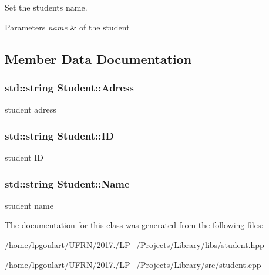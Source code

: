 Set the student\textquotesingle{}s name. 


\begin{DoxyParams}{Parameters}
{\em name} & of the student \\
\hline
\end{DoxyParams}


\subsection{Member Data Documentation}
\subsubsection[{\texorpdfstring{Adress}{Adress}}]{\setlength{\rightskip}{0pt plus 5cm}std\+::string Student\+::\+Adress\hspace{0.3cm}{\ttfamily [private]}}\hypertarget{classStudent_a2ce7f219072c295b7f3bc95db09625f3}{}\label{classStudent_a2ce7f219072c295b7f3bc95db09625f3}


student adress 

\subsubsection[{\texorpdfstring{ID}{ID}}]{\setlength{\rightskip}{0pt plus 5cm}std\+::string Student\+::\+ID\hspace{0.3cm}{\ttfamily [private]}}\hypertarget{classStudent_a1ae2688ebf463a93d001465c510f8970}{}\label{classStudent_a1ae2688ebf463a93d001465c510f8970}


student ID 

\subsubsection[{\texorpdfstring{Name}{Name}}]{\setlength{\rightskip}{0pt plus 5cm}std\+::string Student\+::\+Name\hspace{0.3cm}{\ttfamily [private]}}\hypertarget{classStudent_a914e02c29156e1a3b1b51cad6bbc9083}{}\label{classStudent_a914e02c29156e1a3b1b51cad6bbc9083}


student name 



The documentation for this class was generated from the following files\+:\begin{DoxyCompactItemize}
\item 
/home/lpgoulart/\+U\+F\+R\+N/2017./\+L\+P\+\_/\+Projects/\+Library/libs/\hyperlink{student_8hpp}{student.\+hpp}\item 
/home/lpgoulart/\+U\+F\+R\+N/2017./\+L\+P\+\_/\+Projects/\+Library/src/\hyperlink{student_8cpp}{student.\+cpp}\end{DoxyCompactItemize}
